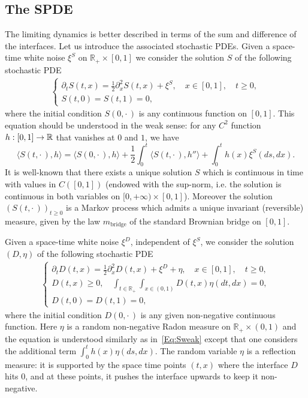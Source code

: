 \documentclass[10pt]{amsart}
\theoremstyle{definition}\newtheorem{defi}[theo]{Definition}\newtheorem{rema}[theo]{Remark}\newtheorem{exam}[theo]{Example}\newtheorem{exem}[theo]{Example}\newtheorem{nota}[theo]{Notation}
\theoremstyle{plain}
\newcommand{\R}{\mathbb{R}}
\newcommand{\mBB}{m_{\mathrm{bridge}}}
\renewcommand*{\to}{\mathchoice{\longrightarrow}{\rightarrow}{\rightarrow}{\rightarrow}}
\begin{document}
\subsection{The SPDE}\label{Sec:SPDEPair}

The limiting dynamics is better described in terms of the sum and difference of the interfaces. Let us introduce the associated stochastic PDEs. Given a space-time white noise $\xi^S$ on $\R_+\times[0,1]$ we consider the solution $S$ of the following stochastic PDE
\begin{align*}
\begin{cases}
\partial_t S(t,x) = \frac12 \partial_x^2 S(t,x) + \xi^S,\quad x\in [0,1],\quad t\ge 0,\\
S(t,0)=S(t,1)=0,
\end{cases}
\end{align*}
where the initial condition $S(0,\cdot\,)$ is any continuous function on $[0,1]$. This equation should be understood in the weak sense: for any $C^2$ function $h:[0,1]\to\R$ that vanishes at $0$ and $1$, we have
\begin{equation}\label{Eq:Sweak}
\langle S(t,\cdot\,),h\rangle = \langle S(0,\cdot\,),h\rangle + \frac12\int_0^t \langle S(t,\cdot\,),h''\rangle +\int_0^t h(x) \xi^S(ds,dx).
\end{equation}
It is well-known that there exists a unique solution $S$ which is continuous in time with values in $C([0,1])$ (endowed with the sup-norm, i.e. the solution is continuous in both variables on $[0,+\infty)\times [0,1]$). Moreover the solution $(S(t,\cdot\,))_{t\geq 0}$ is a Markov process which admits a unique invariant (reversible) measure, given by the law $\mBB$ of the standard Brownian bridge on $[0,1]$.

Given a space-time white noise $\xi^D$, independent of $\xi^S$, we consider the solution $(D,\eta)$ of the following stochastic PDE
\begin{align}
\begin{cases}
\partial_t D(t,x) = \frac12 \partial_x^2 D(t,x) + \xi^D + \eta,\quad x\in [0,1],\quad t\ge 0,\\
D(t,x)\ge 0,\quad \int_{t\in\R_+} \int_{x\in (0,1)} D(t,x) \eta(dt,dx) = 0,\\
D(t,0)=D(t,1)=0,
\end{cases}\label{eq:NP}
\end{align}
where the initial condition $D(0,\cdot\,)$ is any given non-negative continuous function. Here $\eta$ is a random non-negative Radon measure on $\R_+\times (0,1)$ and the equation is understood similarly as in~\eqref{Eq:Sweak} except that one considers the additional term $\int_0^t h(x) \eta(ds,dx)$. The random variable $\eta$ is a reflection measure: it is supported by the space time points $(t,x)$ where the interface $D$ hits $0$, and at these points, it pushes the interface upwards to keep it non-negative.
\end{document}
